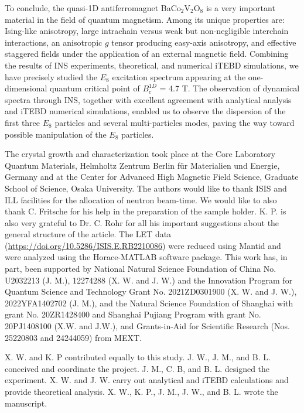 \documentclass[aps,prl,twocolumn,superscriptaddress,groupedaddress]{revtex4}
\begin{document}
To conclude, the quasi-1D antiferromagnet BaCo$_2$V$_2$O$_8$ is a very important material in the field of quantum magnetism. Among its unique properties are: Ising-like anisotropy, large intrachain versus weak but non-negligible interchain interactions, an anisotropic $g$ tensor producing easy-axis anisotropy, and effective staggered fields under the application of an external magnetic field. Combining the results of INS experiments, theoretical, and numerical iTEBD simulations, we have precisely studied the $E_8$ excitation spectrum appearing at the one-dimensional quantum critical point of $B^{1D}_c$ = 4.7 T. The observation of dynamical spectra through INS, together with excellent agreement with analytical analysis and iTEBD numerical simulations, enabled us to observe the dispersion of the first three $E_8$ particles and several multi-particles modes, paving the way toward possible manipulation of the $E_8$ particles.

\par

The crystal growth and characterization took place at the Core Laboratory
Quantum Materials, Helmholtz Zentrum Berlin f\"ur Materialien und Energie,
Germany and at the Center for Advanced High Magnetic Field Science,
Graduate School of Science, Osaka University. The authors would like to thank ISIS and ILL facilities for the allocation of neutron beam-time. We would like to also thank C. Fritsche for his help in the preparation of the sample holder. K. P. is also very grateful to Dr. C. Rohr for all his important suggestions about the general structure of the article. The LET data (\url{https://doi.org/10.5286/ISIS.E.RB2210086}) were reduced using Mantid and were analyzed using the Horace-MATLAB software package. This work has, in part, been supported by National Natural Science Foundation of China No. U2032213 (J. M.), 12274288 (X. W. and J. W.) and the Innovation Program for Quantum Science and Technology Grant No. 2021ZD0301900 (X. W. and J. W.), 2022YFA1402702 (J. M.), and the Natural Science Foundation of Shanghai with grant No. 20ZR1428400 and Shanghai Pujiang Program with grant No. 20PJ1408100 (X.W. and J.W.), and Grants-in-Aid for  Scientific Research (Nos. 25220803 and 24244059) from MEXT. 

\par

X. W. and K. P contributed equally to this study. J. W., J. M., and B. L. conceived and coordinate the project. J. M., C. B, and B. L. designed the experiment.
X. W. and J. W. carry out analytical and iTEBD calculations and provide theoretical analysis. X. W., K. P., J. M., J. W., and B. L. wrote the manuscript. 
\end{document}
